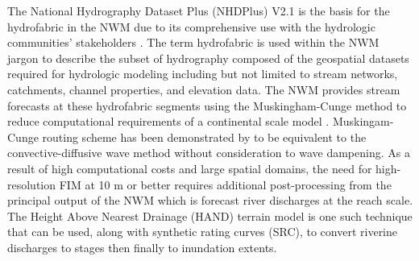 The National Hydrography Dataset Plus (NHDPlus) V2.1 is the basis for the hydrofabric in the NWM due to its comprehensive use with the hydrologic communities' stakeholders \cite{mckay2012nhdplus}. 
The term hydrofabric is used within the NWM jargon to describe the subset of hydrography composed of the geospatial datasets required for hydrologic modeling including but not limited to stream networks, catchments, channel properties, and elevation data. 
The NWM provides stream forecasts at these hydrofabric segments using the Muskingham-Cunge method to reduce computational requirements of a continental scale model \cite{bedient2008hydrology,ponce1994variable,gochis2018wrf}.
Muskingam-Cunge routing scheme has been demonstrated by  to be equivalent to the convective-diffusive wave method without consideration to wave dampening.
As a result of high computational costs and large spatial domains, the need for high-resolution FIM at 10 m or better requires additional post-processing from the principal output of the NWM which is forecast river discharges at the reach scale. The Height Above Nearest Drainage (HAND) terrain model is one such technique that can be used, along with synthetic rating curves (SRC), to convert riverine discharges to stages then finally to inundation extents.
%
